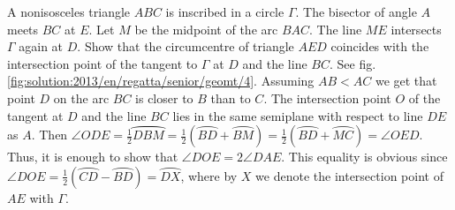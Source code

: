 \problem
A nonisosceles triangle $ABC$ is inscribed in a circle $\Gamma$.
The bisector of angle $A$ meets $BC$ at $E$.
Let $M$ be the midpoint of the arc $BAC$.
The line $ME$ intersects $\Gamma$ again at $D$.
Show that the circumcentre of triangle $AED$ coincides with the intersection
point of the tangent to $\Gamma$ at $D$ and the line $BC$.
%
\label{solution:2013/en/regatta/senior/geomt/4}%
See fig. \ref{fig:solution:2013/en/regatta/senior/geomt/4}.
Assuming $AB < AC$ we get that point $D$ on the arc $BC$ is closer to $B$ than
to $C$.
The intersection point $O$ of the tangent at $D$ and the line $BC$ lies in the
same semiplane with respect to line $DE$ as $A$.
Then
\(
    \angle ODE = \frac{1}{2} \wideparen{DBM}
=
    \frac{1}{2} (\wideparen{BD} + \wideparen{BM})
=
    \frac{1}{2} (\wideparen{BD} + \wideparen{MC})
=
    \angle OED
\).
Thus, it is enough to show that $\angle DOE = 2\angle DAE$.
This equality is obvious since
$\angle DOE = \frac{1}{2} (\wideparen{CD} - \wideparen{BD}) = \wideparen{DX}$,
where by $X$ we denote the intersection point of $AE$ with $\Gamma$.
\endproblem
